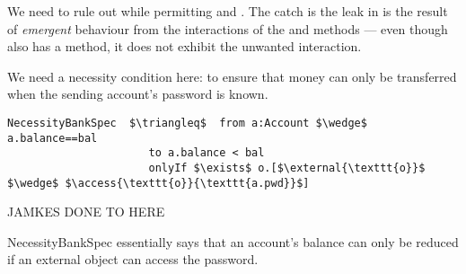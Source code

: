 We need to rule out  while permitting  and
. The catch is the leak in  is the result
of  \emph{emergent} behaviour from the interactions of the 
and  methods --- even though  also has a
 method, it does not exhibit the unwanted interaction.



We need a necessity condition here: to ensure that money can only be
transferred when the sending account's password is known.

 

 
 \begin{lstlisting}[language = Chainmail, mathescape=true, frame=lines]
NecessityBankSpec  $\triangleq$  from a:Account $\wedge$ a.balance==bal
                      to a.balance < bal
                      onlyIf $\exists$ o.[$\external{\texttt{o}}$ $\wedge$ $\access{\texttt{o}}{\texttt{a.pwd}}$]
\end{lstlisting}

JAMKES  DONE TO HERE

 NecessityBankSpec essentially says that an account's balance can only
 be reduced if an external object can access the password.
  
 
